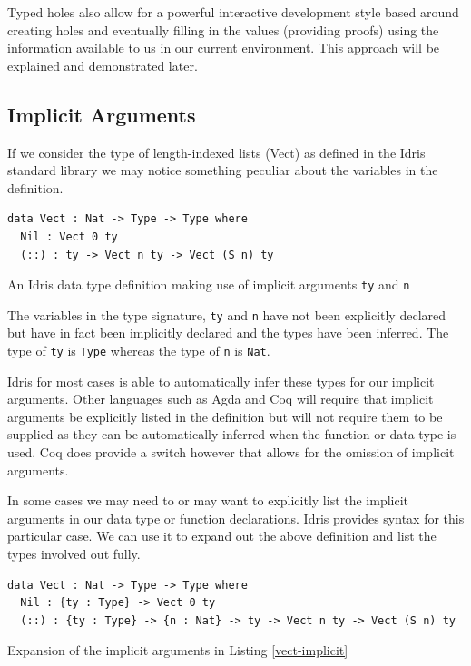 \documentclass[a4paper, notitlepage]{report}
\begin{document}
Typed holes also allow for a powerful interactive development style based around
creating holes and eventually filling in the values (providing proofs) using the
information available to us in our current environment. This approach will be
explained and demonstrated later.

\subsection{Implicit Arguments}
\label{sec:orgba3dff1}
If we consider the type of length-indexed lists (Vect) as defined in the Idris
standard library we may notice something peculiar about the variables in the
definition.

\begin{listing}[H]
\begin{verbatim}
data Vect : Nat -> Type -> Type where
  Nil : Vect 0 ty
  (::) : ty -> Vect n ty -> Vect (S n) ty
\end{verbatim}
\caption{An Idris data type definition making use of implicit arguments \texttt{ty} and \texttt{n} \label{vect-implicit}}
\end{listing}

The variables in the type signature, \texttt{ty} and \texttt{n} have not been explicitly declared
but have in fact been implicitly declared and the types have been inferred. The
type of \texttt{ty} is \texttt{Type} whereas the type of \texttt{n} is \texttt{Nat}.

Idris for most cases is able to automatically infer these types for our implicit
arguments. Other languages such as Agda and Coq will require that implicit
arguments be explicitly listed in the definition but will not require them to be
supplied as they can be automatically inferred when the function or data type is
used. Coq does provide a switch however that allows for the omission of implicit
arguments.

In some cases we may need to or may want to explicitly list the implicit
arguments in our data type or function declarations. Idris provides syntax for
this particular case. We can use it to expand out the above definition and list
the types involved out fully.

\begin{listing}[H]
\begin{verbatim}
data Vect : Nat -> Type -> Type where
  Nil : {ty : Type} -> Vect 0 ty
  (::) : {ty : Type} -> {n : Nat} -> ty -> Vect n ty -> Vect (S n) ty
\end{verbatim}
\caption{Expansion of the implicit arguments in Listing \ref{vect-implicit}}
\end{listing}
\end{document}
